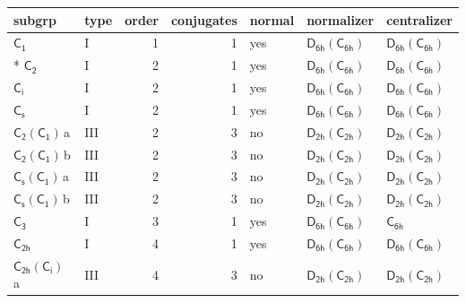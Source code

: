 \documentclass[10pt,a4paper]{article}
\numberwithin{equation}{section}
\newcommand{\grp}[1]{\mathsf{#1}}
\newcommand{\clsletter}[1]{\,{\scriptsize\color{black!55}#1}}
\begin{document}
{\small\begin{longtable}{@{}llrrlll@{}}\toprule
subgrp & type & order & conjugates & normal & normalizer & centralizer\\\midrule\endhead
\bottomrule\endfoot\endlastfoot
\href{../../../rotation/data/pdf/C1.pdf}{$\grp{C_{1}}$} & I & 1 & 1 & yes & \href{D6h-C6h.pdf}{$\grp{D_{6h}}(\grp{C_{6h}})$} & \href{D6h-C6h.pdf}{$\grp{D_{6h}}(\grp{C_{6h}})$}\\*
\href{../../../rotation/data/pdf/C2.pdf}{$\grp{C_{2}}$} & I & 2 & 1 & yes & \href{D6h-C6h.pdf}{$\grp{D_{6h}}(\grp{C_{6h}})$} & \href{D6h-C6h.pdf}{$\grp{D_{6h}}(\grp{C_{6h}})$}\\
\href{../../../rotation/data/pdf/S2.pdf}{$\grp{C_{i}}$} & I & 2 & 1 & yes & \href{D6h-C6h.pdf}{$\grp{D_{6h}}(\grp{C_{6h}})$} & \href{D6h-C6h.pdf}{$\grp{D_{6h}}(\grp{C_{6h}})$}\\
\href{../../../rotation/data/pdf/C1v.pdf}{$\grp{C_{s}}$} & I & 2 & 1 & yes & \href{D6h-C6h.pdf}{$\grp{D_{6h}}(\grp{C_{6h}})$} & \href{D6h-C6h.pdf}{$\grp{D_{6h}}(\grp{C_{6h}})$}\\
\href{C2-C1.pdf}{$\grp{C_{2}}(\grp{C_{1}})$}\clsletter{a} & III & 2 & 3 & no & \href{D2h-C2h.pdf}{$\grp{D_{2h}}(\grp{C_{2h}})$} & \href{D2h-C2h.pdf}{$\grp{D_{2h}}(\grp{C_{2h}})$}\\
\href{C2-C1.pdf}{$\grp{C_{2}}(\grp{C_{1}})$}\clsletter{b} & III & 2 & 3 & no & \href{D2h-C2h.pdf}{$\grp{D_{2h}}(\grp{C_{2h}})$} & \href{D2h-C2h.pdf}{$\grp{D_{2h}}(\grp{C_{2h}})$}\\
\href{C1v-C1.pdf}{$\grp{C_{s}}(\grp{C_{1}})$}\clsletter{a} & III & 2 & 3 & no & \href{D2h-C2h.pdf}{$\grp{D_{2h}}(\grp{C_{2h}})$} & \href{D2h-C2h.pdf}{$\grp{D_{2h}}(\grp{C_{2h}})$}\\
\href{C1v-C1.pdf}{$\grp{C_{s}}(\grp{C_{1}})$}\clsletter{b} & III & 2 & 3 & no & \href{D2h-C2h.pdf}{$\grp{D_{2h}}(\grp{C_{2h}})$} & \href{D2h-C2h.pdf}{$\grp{D_{2h}}(\grp{C_{2h}})$}\\
\href{../../../rotation/data/pdf/C3.pdf}{$\grp{C_{3}}$} & I & 3 & 1 & yes & \href{D6h-C6h.pdf}{$\grp{D_{6h}}(\grp{C_{6h}})$} & \href{../../../rotation/data/pdf/C6h.pdf}{$\grp{C_{6h}}$}\\
\href{../../../rotation/data/pdf/C2h.pdf}{$\grp{C_{2h}}$} & I & 4 & 1 & yes & \href{D6h-C6h.pdf}{$\grp{D_{6h}}(\grp{C_{6h}})$} & \href{D6h-C6h.pdf}{$\grp{D_{6h}}(\grp{C_{6h}})$}\\
\href{C2h-S2.pdf}{$\grp{C_{2h}}(\grp{C_{i}})$}\clsletter{a} & III & 4 & 3 & no & \href{D2h-C2h.pdf}{$\grp{D_{2h}}(\grp{C_{2h}})$} & \href{D2h-C2h.pdf}{$\grp{D_{2h}}(\grp{C_{2h}})$}\\

\end{longtable}}
\end{document}
